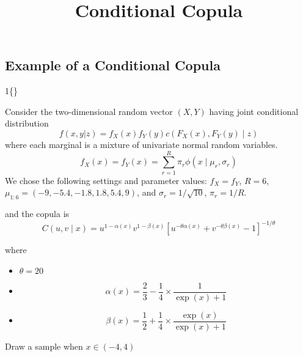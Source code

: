\documentclass[]{article}
\title{Conditional Copula}
\author{}
\date{\vspace{-2.5em}}
\begin{document}
\maketitle

\subsection{Example of a Conditional
Copula}\label{example-of-a-conditional-copula}

\def\mb \#1\{\}

Consider the two-dimensional random vector \((X, Y)\) having joint
conditional distribution \[
f(x,y|z)=f_X(x)f_Y(y)c(F_X(x),F_Y(y)\mid z)
\] where each marginal is a mixture of univariate normal random
variables. \[
f_X(x) = f_Y(x) = \sum_{r=1}^{R}\pi_r\phi(x\mid \mu_r, \sigma_r)
\] We chose the following settings and parameter values: \(f_X = f_Y\),
\(R = 6\), \(\mu_{1:6} = (-9, -5.4, -1.8, 1.8, 5.4, 9)\), and
\(\sigma_r = 1/\sqrt{10}\), \(\pi_r = 1/R\).

and the copula is \[
C(u,v \mid x )=u^{1-\alpha(x)}v^{1-\beta(x)}[u^{-\theta\alpha(x)}+v^{-\theta\beta(x)}-1]^{-1/\theta}
\]

where

\begin{itemize}
\item
  \(\theta=20\)
\item
  \[
    \alpha(x)=\frac{2}{3}-\frac{1}{4}\times\frac{1}{\exp(x)+1}
    \]
\item
  \[
    \beta(x)=\frac{1}{2}+\frac{1}{4}\times\frac{\exp(x)}{\exp(x)+1}
    \]
\end{itemize}

Draw a sample when \(x\in (-4,4)\)
\end{document}
